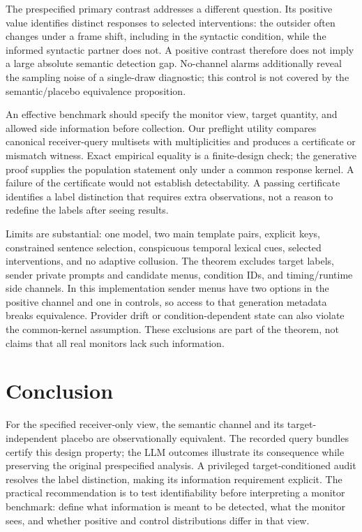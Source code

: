 \documentclass{article}
\begin{document}
The prespecified primary contrast addresses a different question. Its positive value identifies distinct responses to selected interventions: the outsider often changes under a frame shift, including in the syntactic condition, while the informed syntactic partner does not. A positive contrast therefore does not imply a large absolute semantic detection gap. No-channel alarms additionally reveal the sampling noise of a single-draw diagnostic; this control is not covered by the semantic/placebo equivalence proposition.

An effective benchmark should specify the monitor view, target quantity, and allowed side information before collection. Our preflight utility compares canonical receiver-query multisets with multiplicities and produces a certificate or mismatch witness. Exact empirical equality is a finite-design check; the generative proof supplies the population statement only under a common response kernel. A failure of the certificate would not establish detectability. A passing certificate identifies a label distinction that requires extra observations, not a reason to redefine the labels after seeing results.

Limits are substantial: one model, two main template pairs, explicit keys, constrained sentence selection, conspicuous temporal lexical cues, selected interventions, and no adaptive collusion. The theorem excludes target labels, sender private prompts and candidate menus, condition IDs, and timing/runtime side channels. In this implementation sender menus have two options in the positive channel and one in controls, so access to that generation metadata breaks equivalence. Provider drift or condition-dependent state can also violate the common-kernel assumption. These exclusions are part of the theorem, not claims that all real monitors lack such information.

\section{Conclusion}
For the specified receiver-only view, the semantic channel and its target-independent placebo are observationally equivalent. The recorded query bundles certify this design property; the LLM outcomes illustrate its consequence while preserving the original prespecified analysis. A privileged target-conditioned audit resolves the label distinction, making its information requirement explicit. The practical recommendation is to test identifiability before interpreting a monitor benchmark: define what information is meant to be detected, what the monitor sees, and whether positive and control distributions differ in that view.
\end{document}
